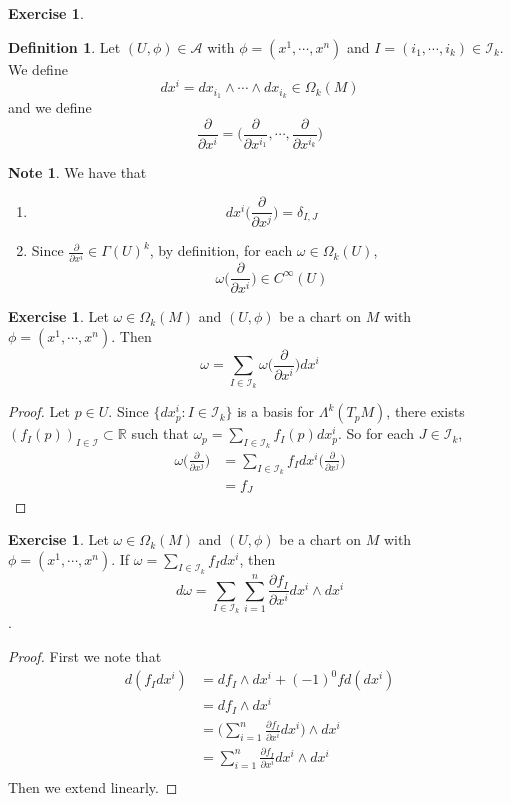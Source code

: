 \documentclass{book}
\theoremstyle{definition}
\newtheorem{defn}[definition]{Definition}
\newtheorem{note}[definition]{Note}
\newtheorem{ex}[definition]{Exercise}
\newcommand{\del}{\delta}
\newcommand{\om}{\omega}
\newcommand{\Gam}{\Gamma}
\newcommand{\Lam}{\Lambda}
\newcommand{\Om}{\Omega}
\newcommand{\R}{\mathbb{R}}
\newcommand{\MA}{\mathcal{A}}
\newcommand{\MI}{\mathcal{I}}
\DeclareMathOperator*{\0}{\mbf{0}}
\DeclareMathOperator*{\1}{\mbf{1}}
\newcommand{\p}{\partial}
\begin{document}
	\begin{ex}
	
	\end{ex}

	\begin{defn}
		Let $(U, \phi) \in \MA$ with $\phi = (x^1, \cdots, x^n)$ and $I = (i_1, \cdots, i_k) \in \MI_k$. We define $$dx^i = dx_{i_1} \wedge \cdots \wedge dx_{i_k} \in \Om_k(M)$$ 
		and we define $$\frac{\p}{\p x^i}= \bigg(\frac{\p}{\p x^{i_1}}, \cdots, \frac{\p}{\p x^{i_k}} \bigg)$$

	\end{defn}
	
	\begin{note} We have that
	\begin{enumerate}
	\item  $$d x^i \bigg (\frac{\p}{\p x^j} \bigg) = \del_{I,J}$$
	\item Since $\frac{\p}{\p x^i} \in \Gam(U)^k$, by definition, for each $\om \in \Om_k(U)$, $$\om \bigg(\frac{\p}{\p x^i} \bigg) \in C^{\infty}(U)$$
	\end{enumerate}
	\end{note}

	\begin{ex}
		Let $\om \in \Om_k(M)$ and $(U, \phi)$ be a chart on $M$ with $\phi = (x^1, \cdots, x^n)$. Then $$\om = \sum_{I \in \MI_k}\om \bigg(\frac{\p}{\p x^i} \bigg) dx^i$$
	\end{ex}

	\begin{proof}
		Let $p \in U$. Since $\{dx^i_p: I \in \MI_k\}$ is a basis for $\Lam^k(T_pM)$, there exists $(f_I(p))_{I \in \MI} \subset \R$ such that $\om_p = \sum\limits_{I \in \MI_k} f_I(p) dx^i_p$. So for each $J \in \MI_k$, 
		\begin{align*}
			\om\bigg (\frac{\p}{\p x^j} \bigg ) 
			&= \sum\limits_{I \in \MI_k} f_I dx^i \bigg (\frac{\p}{\p x^j} \bigg )  \\
			&= f_J
		\end{align*} 
	\end{proof}

	\begin{ex}
		Let $\om \in \Om_k(M)$ and $(U, \phi)$ be a chart on $M$ with $\phi = (x^1, \cdots, x^n)$. If $\om = \sum\limits_{I \in \MI_k}f_I dx^i$, then $$d \om  = \sum_{I \in \MI_k} \sum_{i =1}^n \frac{\p f_I}{\p x^i} dx^i \wedge dx^i$$.
	\end{ex}

	\begin{proof}
		First we note that
		\begin{align*}
			d(f_I dx^i) 
			&= df_I \wedge dx^i + (-1)^0 f d(dx^i) \\
			&= df_I \wedge dx^i \\
			&= \bigg( \sum\limits_{i=1}^n \frac{\p f_I}{\p x^i}dx^i  \bigg) \wedge dx^i \\
			&= \sum\limits_{i=1}^n {\frac{\p f_I}{\p x^i}}dx^i \wedge dx^i \\
		\end{align*}
		Then we extend linearly.
	\end{proof}
	
\end{document}
